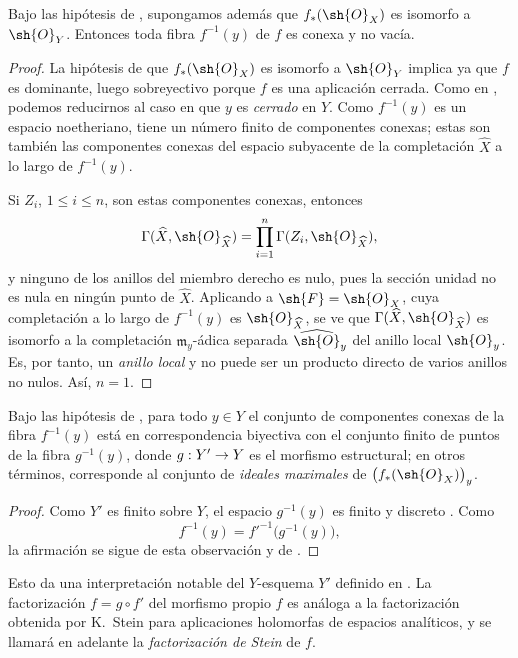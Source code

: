 \documentclass[oneside]{amsart}
\makeatletter
\renewcommand{\leq}{\leqslant}
\newcommand{\ega@arrow}[2]{\mathchoice{#1}{#2}{#2}{#2}}
\renewcommand{\to}{\ega@arrow{\longrightarrow}{\rightarrow}}
\let\EGAOriginalLabel\label
\renewcommand{\label}[1]{\phantomsection\EGAOriginalLabel{#1}}
\makeatother
\begin{document}
\begin{corollary}[4.3.2]
\label{III.4.3.2}
Bajo las hipótesis de , supongamos además que
$f_*(\sh{O}_X)$ es isomorfo a $\sh{O}_Y$. Entonces toda fibra
$f^{-1}(y)$ de $f$ es conexa y no vacía.
\end{corollary}

\begin{proof}
La hipótesis de que $f_*(\sh{O}_X)$ es isomorfo a $\sh{O}_Y$ implica
ya que $f$ es dominante, luego sobreyectivo porque $f$ es una
aplicación cerrada. Como en , podemos reducirnos al
caso en que $y$ es \emph{cerrado} en $Y$. Como $f^{-1}(y)$ es un espacio
noetheriano, tiene un número finito de componentes conexas; estas son
también las componentes conexas del espacio subyacente de la
completación $\widehat{X}$ a lo largo de $f^{-1}(y)$.

Si $Z_i$, $1\leq i\leq n$, son estas componentes conexas, entonces
\[
  \Gamma(\widehat{X},\sh{O}_{\widehat{X}})
  =
  \prod_{i=1}^{n}\Gamma(Z_i,\sh{O}_{\widehat{X}}),
\]
y ninguno de los anillos del miembro derecho es nulo, pues la sección
unidad no es nula en ningún punto de $\widehat{X}$. Aplicando
 a $\sh{F}=\sh{O}_X$, cuya completación a lo largo de
$f^{-1}(y)$ es $\sh{O}_{\widehat{X}}$, se ve que
$\Gamma(\widehat{X},\sh{O}_{\widehat{X}})$ es isomorfo a la
completación $\mathfrak{m}_y$-ádica separada
$\widehat{\sh{O}}_y$ del anillo local $\sh{O}_y$. Es, por tanto, un
\emph{anillo local} y no puede ser un producto directo de varios anillos no
nulos. Así, $n=1$.
\end{proof}

\begin{corollary}[4.3.3]
\label{III.4.3.3}
Bajo las hipótesis de , para todo $y\in Y$ el conjunto
de componentes conexas de la fibra $f^{-1}(y)$ está en correspondencia
biyectiva con el conjunto finito de puntos de la fibra
$g^{-1}(y)$, donde $g:Y'\to Y$ es el morfismo estructural; en otros
términos, corresponde al conjunto de \emph{ideales maximales} de
$\bigl(f_*(\sh{O}_X)\bigr)_y$.
\end{corollary}

\begin{proof}
Como $Y'$ es finito sobre $Y$, el espacio $g^{-1}(y)$ es finito y
discreto . Como
\[
  f^{-1}(y)=f'^{-1}\bigl(g^{-1}(y)\bigr),
\]
la afirmación se sigue de esta observación y de
.
\end{proof}

Esto da una interpretación notable del $Y$-esquema $Y'$ definido en
. La factorización
$f=g\circ f'$ del morfismo propio $f$ es análoga a la factorización
obtenida por K.~Stein para aplicaciones holomorfas de espacios
analíticos, y se llamará en adelante la \emph{factorización de Stein}
de $f$.
\end{document}
